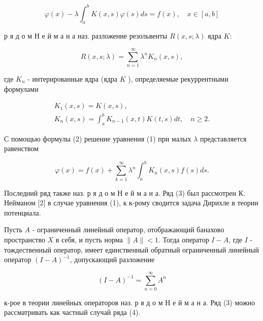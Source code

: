 \documentclass[10pt]{article}
\begin{document}
\[

\varphi(x)-\lambda \int_{a}^{b} K(x, s) \varphi(s) d s=f(x), \quad x \in[a, b]

\]



р я д о м Н е й м а н а наз. разложение резольвенты $R(x, s ; \lambda)$ ядра $K:$



\[

R(x, s ; \lambda)=\sum_{n=1}^{\infty} \lambda^{n} K_{n}(x, s),

\]



где $K_{n}$ - интерированные ядра (ядра $K$ ), определяемые рекуррентными формулами



\[

\begin{gathered}

K_{1}(x, s)=K(x, s), \\

K_{n}(x, s)=\int_{a}^{b} K_{n-1}(x, t) K(t, s) d t, \quad n \geqslant 2 .

\end{gathered}

\]



С помощью формулы (2) решение уравнения (1) при малых $\lambda$ представляется равенством



\[

\varphi(x)=f(x)+\sum_{k=1}^{\infty} \lambda^{n} \int_{a}^{b} K_{n}(x, s) f(s) d s .

\]



Последний ряд также наз. р я д о м Н е й м а н а. Ряд (3) был рассмотрен К. Нейманом [2] в случае уравнения (1), к к-рому сводится задача Дирихле в теории потенциала.



Пусть $A$ - ограниченный линейный оператор, отображающий банахово пространство $X$ в себя, и пусть норма $\|A\|<1$. Тогда оператор $I-A$, где $I$ - тождественный оператор, имеет единственный обратный ограниченный линейный оператор $(I-A)^{-1}$, допускающий разложение



\[

(I-A)^{-1}=\sum_{n=0}^{\infty} A^{n}

\]



к-рое в теории линейных операторов наз. р я д о м Н е й м а н а. Ряд (3) можно рассматривать как частный случай ряда (4).
\end{document}
